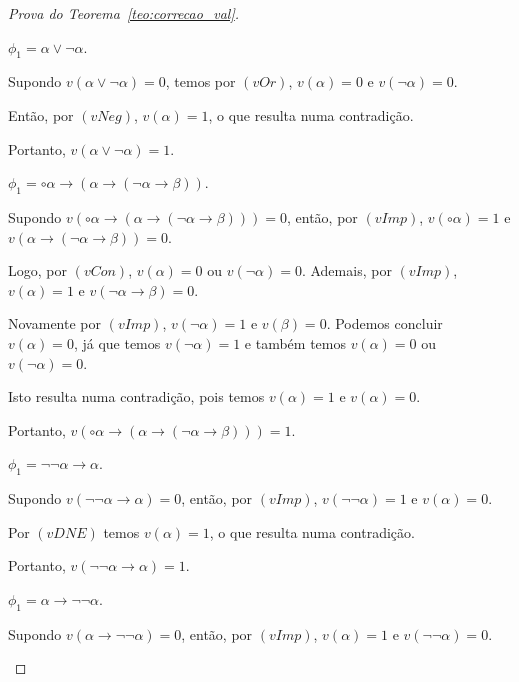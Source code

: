 \begin{proof}[Prova do Teorema~\ref{teo:correcao_val}]
\begin{provaporcasos}
\begin{provaporsubcasos}
                    \subcasodeprova{} $\phi_{1} = \alpha \lor \neg \alpha$. 
                    
                        Supondo $v(\alpha \lor \neg \alpha) = 0$, temos por $(vOr)$, $v(\alpha) = 0$ e $v(\neg \alpha) = 0$. 
                        
                        Então, por $(vNeg)$, $v(\alpha) = 1$, o que resulta numa contradição. 
                        
                        Portanto, $v(\alpha \lor \neg \alpha) = 1$.
    
                    \subcasodeprova{} $\phi_{1} = \circ \alpha \to (\alpha \to (\neg \alpha \to \beta))$. 
                    
                        Supondo $v(\circ \alpha \to (\alpha \to (\neg \alpha \to \beta))) = 0$, então, por $(vImp)$, $v(\circ \alpha) = 1$ e $v(\alpha \to (\neg \alpha \to \beta)) = 0$. 
                        
                        Logo, por $(vCon)$, $v(\alpha) = 0$ ou $v(\neg \alpha) = 0$. Ademais, por $(vImp)$, $v(\alpha) = 1$ e $v(\neg \alpha \to \beta) = 0$. 
                        
                        Novamente por $(vImp)$, $v(\neg \alpha) = 1$ e $v(\beta) = 0$. Podemos concluir $v(\alpha) = 0$, já que temos $v(\neg \alpha) = 1$ e também temos $v(\alpha) = 0$ ou $v(\neg \alpha) = 0$. 
                        
                        Isto resulta numa contradição, pois temos $v(\alpha) = 1$ e $v(\alpha) = 0$. 
                        
                        Portanto, $v(\circ \alpha \to (\alpha \to (\neg \alpha \to \beta))) = 1$.
    
                    \subcasodeprova{} $\phi_{1} = \neg \neg \alpha \to \alpha$. 
                        
                        Supondo $v(\neg \neg \alpha \to \alpha) = 0$, então, por $(vImp)$, $v(\neg \neg \alpha) = 1$ e $v(\alpha) = 0$. 
                        
                        Por $(vDNE)$ temos $v(\alpha) = 1$, o que resulta numa contradição. 
                        
                        Portanto, $v(\neg \neg \alpha \to \alpha) = 1$.
    
                    \subcasodeprova{} $\phi_{1} = \alpha \to \neg \neg \alpha$. 
                    
                        Supondo $v(\alpha \to \neg \neg \alpha) = 0$, então, por $(vImp)$, $v(\alpha) = 1$ e $v(\neg \neg \alpha) = 0$. 
                        

\end{provaporsubcasos}
\end{provaporcasos}
\end{proof}
